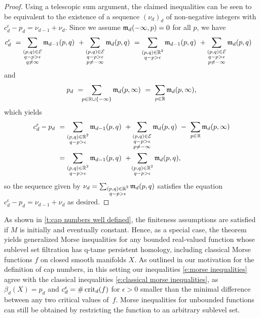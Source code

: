 \begin{proof}
	Using a telescopic sum argument, the claimed inequalities can be seen to be equivalent to the existence of a sequence $(\nu_d)_d$ of non-negative integers with $c_{d}^{\epsilon} - p_{d} = \nu_{d-1} + \nu_{d}$.
	Since we assume $\mathfrak{m}_d(-\infty, p) = 0$ for all $p$, we have
	\begin{align*}
	c_{d}^{\epsilon} \ &=
	\sum_{\substack{(p,q) \in \mathcal{E} \\ q-p > \epsilon \\ q \neq \infty}} \mathfrak{m}_{d-1}(p,q) \ +
	\sum_{\substack{(p,q) \in \mathcal{E} \\ q-p > \epsilon \\ p \neq -\infty}} \mathfrak{m}_d(p,q) \ =
	\sum_{\substack{(p,q) \in \mathbb{R}^2 \\ q-p > \epsilon }} \mathfrak{m}_{d-1}(p,q) \ +
	\sum_{\substack{(p,q) \in \mathcal{E} \\ q-p > \epsilon \\ p \neq -\infty}} \mathfrak{m}_d(p,q)
	\end{align*}
	and
	\begin{equation*}
	p_{d} \ = \!\!\!
	\sum_{p \in \mathbb{R} \cup \{-\infty\}} \mathfrak{m}_d(p,\infty) \ = \
	\sum_{p \in \mathbb{R}} \mathfrak{m}_d(p,\infty),
	\end{equation*}
	which yields
	\begin{align*}
	c_{d}^{\epsilon} - p_{d} \ &=
	\sum_{\substack{(p,q) \in \mathbb{R}^2 \\ q-p > \epsilon}} \mathfrak{m}_{d-1}(p,q) \ +
	\sum_{\substack{(p,q) \in \mathcal{E} \\ q-p > \epsilon \\ p \neq -\infty}} \mathfrak{m}_d(p,q) \ - \
	\sum_{p \in \mathbb{R}} \mathfrak{m}_d(p,\infty) \\ &=
	\sum_{\substack{(p,q) \in \mathbb{R}^2 \\ q-p > \epsilon}} \mathfrak{m}_{d-1}(p,q)
	\ + \!
	\sum_{\substack{(p,q) \in \mathbb{R}^2 \\ q-p > \epsilon}} \mathfrak{m}_d(p,q),
	\end{align*}
	so the sequence given by $\nu_d = \sum_{\substack{(p,q) \in \mathbb{R}^2 \\ q-p > \epsilon}} \mathfrak{m}_d(p,q)$ satisfies the equation $c_{d}^{\epsilon} - p_{d} = \nu_{d-1} + \nu_{d}$ as desired.
\end{proof}

As shown in \cref{t:cap numbers well defined}, the finiteness assumptions are satisfied if $M$ is initially and eventually constant.
Hence, as a special case, the theorem yields generalized Morse inequalities for any bounded real-valued function whose sublevel set filtration has q-tame persistent homology, including classical Morse functions $f$ on closed smooth manifolds $X$.
As outlined in our motivation for the definition of cap numbers, in this setting our inequalities \eqref{e:morse inequalities} agree with the classical inequalities \eqref{e:classical morse inequalities}, as $\beta_d(X) = p_d$ and $c_d^{\epsilon} = \# \operatorname{crit}_d(f)$ for $\epsilon > 0$ smaller than the minimal difference between any two critical values of~$f$.
Morse inequalities for unbounded functions can still be obtained by restricting the function to an arbitrary sublevel set.

